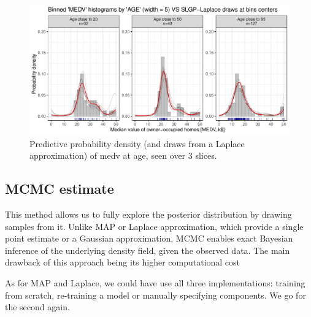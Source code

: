 \documentclass[
]{article}
\begin{document}
\begin{figure}[H]

{\centering \includegraphics{IntroductionSLGP_files/figure-latex/SLGPLaplaceplot-1} 

}

\caption{Predictive probability density (and draws from a Laplace approximation) of medv at age, seen over 3 slices.}\label{fig:SLGPLaplaceplot}
\end{figure}

\subsection{MCMC estimate}\label{mcmc-estimate}

This method allows us to fully explore the posterior distribution by drawing samples from it. Unlike MAP or Laplace approximation, which provide a single point estimate or a Gaussian approximation, MCMC enables exact Bayesian inference of the underlying density field, given the observed data. The main drawback of this approach being its higher computational cost

As for MAP and Laplace, we could have use all three implementations: training from scratch, re-training a model or manually specifying components. We go for the second again.
\end{document}
